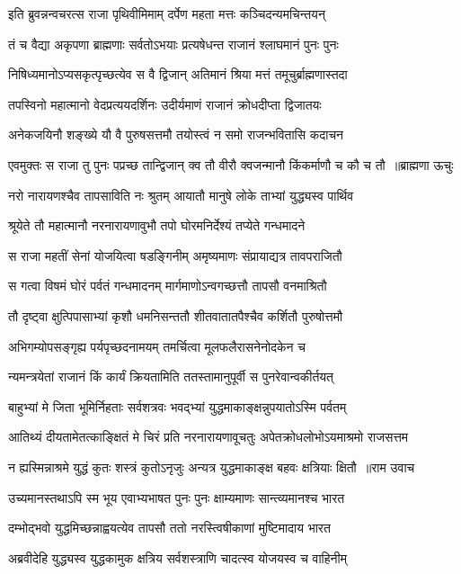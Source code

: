 \twolineshloka
{इति ब्रुवन्नन्वचरत्स राजा पृथिवीमिमाम्}
{दर्पेण महता मत्तः कञ्चिदन्यमचिन्तयन्}


\twolineshloka
{तं च वैद्या अकृपणा ब्राह्मणाः सर्वतोऽभयाः}
{प्रत्यषेधन्त राजानं श्लाघमानं पुनः पुनः}


\twolineshloka
{निषिध्यमानोऽप्यसकृत्पृच्छत्येव स वै द्विजान्}
{अतिमानं श्रिया मत्तं तमूचुर्ब्राह्मणास्तदा}


\twolineshloka
{तपस्विनो महात्मानो वेदप्रत्ययदर्शिनः}
{उदीर्यमाणं राजानं क्रोधदीप्ता द्विजातयः}


\twolineshloka
{अनेकजयिनौ शङ्ख्ये यौ वै पुरुषसत्तमौ}
{तयोस्त्वं न समो राजन्भवितासि कदाचन}


\threelineshloka
{एवमुक्तः स राजा तु पुनः पप्रच्छ तान्द्विजान्}
{क्व तौ वीरौ क्वजन्मानौ किंकर्माणौ च कौ च तौ ॥ब्राह्मणा ऊचुः}
{}


\twolineshloka
{नरो नारायणश्चैव तापसाविति नः श्रुतम्}
{आयातौ मानुषे लोके ताभ्यां युद्ध्यस्व पार्थिव}


\twolineshloka
{श्रूयेते तौ महात्मानौ नरनारायणावुभौ}
{तपो घोरमनिर्देश्यं तप्येते गन्धमादने}


\twolineshloka
{स राजा महतीं सेनां योजयित्वा षडङ्गिनीम्}
{अमृष्यमाणः संप्रायाद्यत्र तावपराजितौ}


\twolineshloka
{स गत्वा विषमं घोरं पर्वतं गन्धमादनम्}
{मार्गमाणोऽन्वगच्छत्तौ तापसौ वनमाश्रितौ}


\twolineshloka
{तौ दृष्ट्वा क्षुत्पिपासाभ्यां कृशौ धमनिसन्ततौ}
{शीतवातातपैश्चैव कर्शितौ पुरुषोत्तमौ}


\twolineshloka
{अभिगम्योपसङ्गृह्य पर्यपृच्छदनामयम्}
{तमर्चित्वा मूलफलैरासनेनोदकेन च}


\twolineshloka
{न्यमन्त्रयेतां राजानं किं कार्यं क्रियतामिति}
{ततस्तामानुपूर्वी स पुनरेवान्वकीर्तयत्}


\twolineshloka
{बाहुभ्यां मे जिता भूमिर्निहताः सर्वशत्रवः}
{भवद्भ्यां युद्धमाकाङ्क्षन्नुपयातोऽस्मि पर्वतम्}


\threelineshloka
{आतिथ्यं दीयतामेतत्काङ्क्षितं मे चिरं प्रति}
{नरनारायणावूचतुः}
{अपेतक्रोधलोभोऽयमाश्रमो राजसत्तम}


\threelineshloka
{न ह्यस्मिन्नाश्रमे युद्धं कुतः शस्त्रं कुतोऽनृजुः}
{अन्यत्र युद्धमाकाङ्क्ष बहवः क्षत्रियाः क्षितौ ॥राम उवाच}
{}


\twolineshloka
{उच्यमानस्तथाऽपि स्म भूय एवाभ्यभाषत}
{पुनः पुनः क्षाम्यमाणः सान्त्व्यमानश्च भारत}


\twolineshloka
{दम्भोद्भवो युद्धमिच्छन्नाह्वयत्येव तापसौ}
{ततो नरस्त्विषीकाणां मुष्टिमादाय भारत}


\twolineshloka
{अब्रवीदेहि युद्ध्यस्व युद्धकामुक क्षत्रिय}
{सर्वशस्त्राणि चादत्स्व योजयस्व च वाहिनीम्}


